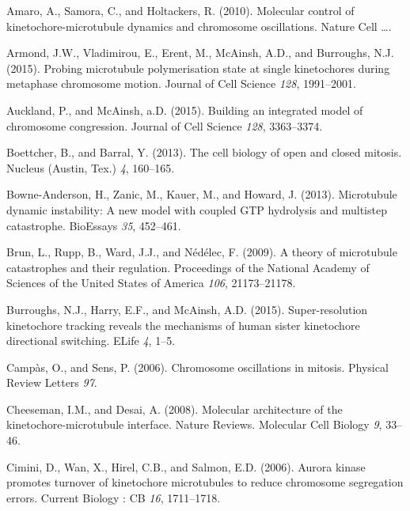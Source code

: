 \documentclass[12pt,a4paper,twoside,openright]{book}
\begin{document}
Amaro, A., Samora, C., and Holtackers, R. (2010). Molecular control of
kinetochore-microtubule dynamics and chromosome oscillations. Nature
Cell \ldots{}.

Armond, J.W., Vladimirou, E., Erent, M., McAinsh, A.D., and Burroughs,
N.J. (2015). Probing microtubule polymerisation state at single
kinetochores during metaphase chromosome motion. Journal of Cell Science
\emph{128}, 1991--2001.

Auckland, P., and McAinsh, a.D. (2015). Building an integrated model of
chromosome congression. Journal of Cell Science \emph{128}, 3363--3374.

Boettcher, B., and Barral, Y. (2013). The cell biology of open and
closed mitosis. Nucleus (Austin, Tex.) \emph{4}, 160--165.

Bowne-Anderson, H., Zanic, M., Kauer, M., and Howard, J. (2013).
Microtubule dynamic instability: A new model with coupled GTP hydrolysis
and multistep catastrophe. BioEssays \emph{35}, 452--461.

Brun, L., Rupp, B., Ward, J.J., and Nédélec, F. (2009). A theory of
microtubule catastrophes and their regulation. Proceedings of the
National Academy of Sciences of the United States of America \emph{106},
21173--21178.

Burroughs, N.J., Harry, E.F., and McAinsh, A.D. (2015). Super-resolution
kinetochore tracking reveals the mechanisms of human sister kinetochore
directional switching. ELife \emph{4}, 1--5.

Campàs, O., and Sens, P. (2006). Chromosome oscillations in mitosis.
Physical Review Letters \emph{97}.

Cheeseman, I.M., and Desai, A. (2008). Molecular architecture of the
kinetochore-microtubule interface. Nature Reviews. Molecular Cell
Biology \emph{9}, 33--46.

Cimini, D., Wan, X., Hirel, C.B., and Salmon, E.D. (2006). Aurora kinase
promotes turnover of kinetochore microtubules to reduce chromosome
segregation errors. Current Biology : CB \emph{16}, 1711--1718.
\end{document}
